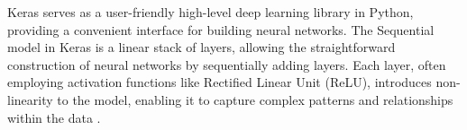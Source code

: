 Keras serves as a user-friendly high-level deep learning library in Python, providing a convenient interface for building neural networks. The Sequential model in Keras is a linear stack of layers, allowing the straightforward construction of neural networks by sequentially adding layers. Each layer, often employing activation functions like Rectified Linear Unit (ReLU), introduces non-linearity to the model, enabling it to capture complex patterns and relationships within the data \citep{gulli_deep_2017}. 

